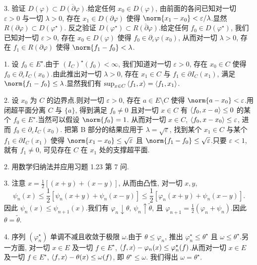 3. 验证 $D(\varphi)\subset\overline{D(\partial\varphi)}$.给定任何 $x_0\in D(\varphi)$,
由前面的各问已知对一切 $\varepsilon>0$ 与一切 $\lambda>0$, 存在 $x_1\in D(\partial\varphi)$
使得 $\norm{x_1-x_0}<\varepsilon/\lambda$.显然 $R(\partial\varphi)\subset D(\varphi^\star)$.
反之验证 $D(\varphi^\star)\subset\overline{R(\partial\varphi)}$.给定任何 $f_0\in D(\varphi^\star)$,
我们已知对一切 $\varepsilon>0$, 存在 $x_0\in D(\varphi)$ 使得 $f_0\in\partial_\varepsilon\varphi(x_0)$,
从而对一切 $\lambda>0$, 存在 $f_1\in R(\partial\varphi)$ 使得 $\norm{f_1-f_0}<\lambda$.


1. 设 $f_0\in E^\star$.由于 $(I_C)^\star(f_0)<\infty$, 我们知道对一切 $\varepsilon>0$, 存在
$x_0\in C$ 使得 $f_0\in\partial_\varepsilon I_C(x_0)$.由此推出对一切 $\lambda>0$, 存在
$x_1\in C$ 与 $f_1\in\partial I_C(x_1)$, 满足 $\norm{f_1-f_0}\le\lambda$.显然我们有
$\sup_{x\in C}\left\langle f_1,x\right\rangle=\left\langle f_1,x_1\right\rangle$.

2. 设 $x_0$ 为 $C$ 的边界点.则对一切 $\varepsilon>0$, 存在 $a\in E\setminus C$ 使得
$\norm{a-x_0}<\varepsilon$.用闭超平面分离 $C$ 与 $\{a\}$, 得到满足 $f_0\ne0$ 且对一切
$x\in C$ 有 $\left\langle f_0,x-a\right\rangle\le0$ 的某个 $f_0\in E^\star$.当然可以假设 $\norm{f_0}=1$.
从而对一切 $x\in C$, $\left\langle f_0,x-x_0\right\rangle\le\varepsilon$, 进而 $f_0\in\partial_\varepsilon I_C(x_0)$.
把第 B 部分的结果应用于 $\lambda=\sqrt{\varepsilon}$, 找到某个 $x_1\in C$ 与某个
$f_1\in\partial I_C(x_1)$ 使得 $\norm{x_1-x_0}\le\sqrt{\varepsilon}$ 且
$\norm{f_1-f_0}\le\sqrt{\varepsilon}$.只要 $\varepsilon<1$, 就有 $f_1\ne0$, 可见存在
$C$ 在 $x_1$ 处的支撑超平面.


2. 用数学归纳法并应用习题 1.23 第 7 问.

3. 注意 $x=\frac12[(x+y)+(x-y)]$, 从而由凸性, 对一切 $x,y$,
\begin{equation*}
\psi_n(x)\le\frac12[\psi_n(x+y)+\psi_n(x-y)]\le\frac12[\varphi_n(x+y)+\psi_n(x-y)].
\end{equation*}
因此 $\psi_n(x)\le\psi_{n+1}(x)$.我们有 $\varphi_n\downarrow\theta$,
$\psi_n\uparrow\tilde\theta$, 且 $\varphi_{n+1}=\frac12(\varphi_n+\psi_n)$.因此 $\theta=\tilde\theta$.

4. 序列 $(\varphi_n^\star)$ 单调不减且收敛于极限 $\omega$.由于 $\theta\le\varphi_n$,
推出 $\varphi_n^\star\le\theta^\star$ 且 $\omega\le\theta^\star$.另一方面, 对一切 $x\in E$
及一切 $f\in E^\star$, $\left\langle f,x\right\rangle-\varphi_n(x)\le\varphi_n^\star(f)$.从而对一切 $x\in E$
及一切 $f\in E^\star$, $\left\langle f,x\right\rangle-\theta(x)\le\omega(f)$, 即 $\theta^\star\le\omega$.
我们得出 $\omega=\theta^\star$.

